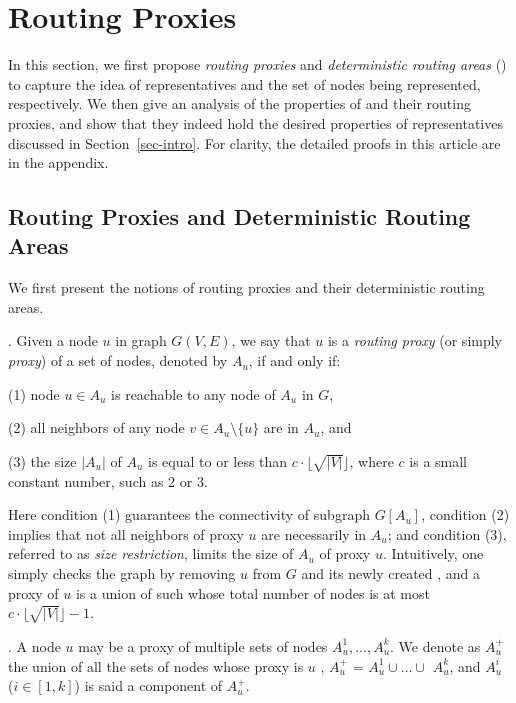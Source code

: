 \section{Routing Proxies}
\label{sec-proxy}



In this section, we first propose {\em routing  proxies} and {\em deterministic routing areas} (\dras) to capture the idea of representatives and the set of
nodes being represented, respectively. We then give an analysis of the properties of  \dras and their routing proxies, and show that they indeed hold the desired properties of representatives discussed in Section~\ref{sec-intro}. For clarity, the detailed proofs in this article are in the appendix.

\subsection{Routing Proxies and Deterministic Routing Areas}
\label{subsec-proxy-def}

We first present the notions of routing proxies and their deterministic routing areas.

. Given a node $u$ in graph $G(V, E)$, we say that $u$ is a {\em routing proxy} (or simply {\em proxy}) of a set of nodes, denoted by $A_{u}$, if and only if:

\sstab(1) node $u\in A_{u}$ is reachable to any node of $A_u$ in $G$,

\sstab(2) all neighbors of any node $v\in A_u\setminus \{u\}$ are in $A_u$,  and

\sstab(3) the size $|A_u|$ of $A_u$ is equal to or less than $c\cdot\lfloor\sqrt{|V|}\rfloor$, where $c$ is a small constant number, such as $2$ or $3$.


Here condition (1) guarantees the connectivity of subgraph $G[A_u]$,  condition (2) implies that not all neighbors of proxy $u$ are necessarily in $A_u$;
and condition (3), referred to as {\em size restriction}, limits the size of $A_u$ of proxy $u$.
Intuitively, one simply checks the graph by removing $u$ from $G$ and its newly created
\ccs , and a proxy of $u$ is a union of such \ccs whose total number of nodes is at most $c\cdot\lfloor\sqrt{|V|}\rfloor - 1$.




. A node $u$ may be a proxy of multiple sets of nodes $A^1_u, \ldots, A^k_u$.
We denote as $A^{+}_u$ the union of all the sets of nodes whose proxy is $u$ , \ie  $A^{+}_u$ = $A^1_u\cup\ldots\cup$ $A^k_u$,
and $A^i_u$ ($i\in[1,k]$) is said a component of $A^{+}_u$.

